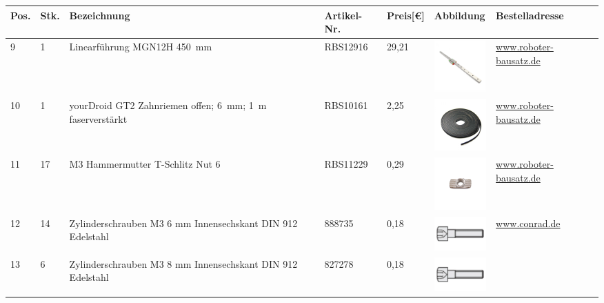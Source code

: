 \begin{center}
		\fontsize{8}{10}\selectfont
		\begin{tabularx}{\textwidth}{|p{0.4cm}|p{0.4cm}|X|X|p{1cm}|X|X|}
		\hline 
		\textbf{Pos.} & \textbf{Stk.} & \textbf{Bezeichnung} & \textbf{Artikel-Nr.}& \textbf{Preis[€]} & \textbf{Abbildung} & \textbf{Bestelladresse} \\ \hline	
		9 & 1 & Linearführung MGN12H 450\ mm & RBS12916 & 29,21  &  \includegraphics[width=2cm]{Images/Material/RBS12916.jpg} & \href{https://www.roboter-bausatz.de/p/linearfuehrung-mgn12h-450mm}{www.roboter-bausatz.de} \\
		\hline			
		10 & 1 & yourDroid GT2 Zahnriemen offen; 6\ mm; 1\ m faserverstärkt & RBS10161 & 2,25  & \includegraphics[width=2cm]{Images/Material/RBS10161.jpg} & \href{https://www.roboter-bausatz.de/p/yourdroid-gt2-zahnriemen-offen-6mm-1-meter-faserverstaerkt}{www.roboter-bausatz.de} \\
		\hline
		11 & 17 & M3 Hammermutter T-Schlitz Nut 6 &  RBS11229 & 0,29   & \includegraphics[width=2cm]{Images/Material/RBS11229.jpg} & \href{https://www.roboter-bausatz.de/p/m3-hammermutter-t-schlitz-nut-6}{www.roboter-bausatz.de} \\
		\hline
		12 & 14 & Zylinderschrauben M3 6 mm Innensechskant DIN 912 Edelstahl & 888735 & 0,18  & \includegraphics[width=2cm]{Images/Material/M3.png} &
		\href{https://www.conrad.de/de/p/toolcraft-888735-zylinderschrauben-m3-6-mm-innensechskant-din-912-edelstahl-a2-1-st-888735.html}{www.conrad.de} \\
		\hline
		13 & 6 & Zylinderschrauben M3 8 mm Innensechskant DIN 912 Edelstahl & 827278 & 0,18  & \includegraphics[width=2cm]{Images/Material/M3.png} &

\end{tabularx}
\end{center}
